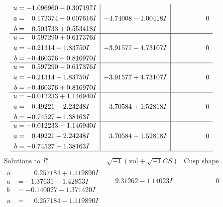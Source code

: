 \documentclass[1p]{elsarticle_modified}
\theoremstyle{definition}
\newcommand{\I}{\sqrt{-1}}
\begin{document}
$$\begin{array}{c|c|c}
\begin{aligned}
u &= -1.096960 - 0.307197 I \\
a &= \phantom{-}0.172374 - 0.007616 I \\
b &= -0.503733 + 0.553418 I\end{aligned}
 & -4.74008 - 1.00418 I & \phantom{-0.000000 } 0 \\ \hline\begin{aligned}
u &= \phantom{-}0.597290 + 0.617376 I \\
a &= -0.21314 + 1.83750 I \\
b &= -0.460376 - 0.816970 I\end{aligned}
 & -3.91577 - 4.73107 I & \phantom{-0.000000 } 0 \\ \hline\begin{aligned}
u &= \phantom{-}0.597290 - 0.617376 I \\
a &= -0.21314 - 1.83750 I \\
b &= -0.460376 + 0.816970 I\end{aligned}
 & -3.91577 + 4.73107 I & \phantom{-0.000000 } 0 \\ \hline\begin{aligned}
u &= -0.012233 + 1.146940 I \\
a &= \phantom{-}0.49221 - 2.24248 I \\
b &= -0.74527 + 1.38163 I\end{aligned}
 & \phantom{-}3.70584 + 1.52818 I & \phantom{-0.000000 } 0 \\ \hline\begin{aligned}
u &= -0.012233 - 1.146940 I \\
a &= \phantom{-}0.49221 + 2.24248 I \\
b &= -0.74527 - 1.38163 I\end{aligned}
 & \phantom{-}3.70584 - 1.52818 I & \phantom{-0.000000 } 0\\
 \hline 
 \end{array}$$\newpage$$\begin{array}{c|c|c}  
\text{Solutions to }I^u_{1}& \I (\text{vol} + \sqrt{-1}CS) & \text{Cusp shape}\\
 \hline 
\begin{aligned}
u &= \phantom{-}0.257184 + 1.119890 I \\
a &= -1.37631 + 1.42853 I \\
b &= -0.140027 - 1.371420 I\end{aligned}
 & \phantom{-}9.31262 - 1.14023 I & \phantom{-0.000000 } 0 \\ \hline\begin{aligned}
u &= \phantom{-}0.257184 - 1.119890 I \\

\end{aligned}
\end{array}$$
\end{document}
